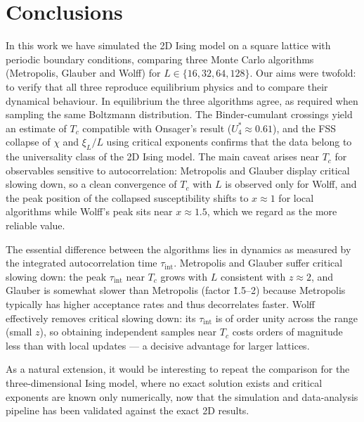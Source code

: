 \chapter{Conclusions} \label{chap:conclusiones}

In this work we have simulated the 2D Ising model on a square lattice with periodic boundary conditions, comparing three Monte Carlo algorithms (Metropolis, Glauber and Wolff) for $L\in\{16,32,64,128\}$. Our aims were twofold: to verify that all three reproduce equilibrium physics and to compare their dynamical behaviour. In equilibrium the three algorithms agree, as required when sampling the same Boltzmann distribution. The Binder-cumulant crossings yield an estimate of $T_c$ compatible with Onsager's result ($U_4^*\approx0.61$), and the FSS collapse of $\chi$ and $\xi_L/L$ using critical exponents confirms that the data belong to the universality class of the 2D Ising model. The main caveat arises near $T_c$ for observables sensitive to autocorrelation: Metropolis and Glauber display critical slowing down, so a clean convergence of $T_c$ with $L$ is observed only for Wolff, and the peak position of the collapsed susceptibility shifts to $x\approx1$ for local algorithms while Wolff's peak sits near $x\approx1.5$, which we regard as the more reliable value.

The essential difference between the algorithms lies in dynamics as measured by the integrated autocorrelation time $\tau_{\mathrm{int}}$. Metropolis and Glauber suffer critical slowing down: the peak $\tau_{\mathrm{int}}$ near $T_c$ grows with $L$ consistent with $z\approx2$, and Glauber is somewhat slower than Metropolis (factor \~1.5–2) because Metropolis typically has higher acceptance rates and thus decorrelates faster. Wolff effectively removes critical slowing down: its $\tau_{\mathrm{int}}$ is of order unity across the range (small $z$), so obtaining independent samples near $T_c$ costs orders of magnitude less than with local updates — a decisive advantage for larger lattices.

As a natural extension, it would be interesting to repeat the comparison for the three-dimensional Ising model, where no exact solution exists and critical exponents are known only numerically, now that the simulation and data-analysis pipeline has been validated against the exact 2D results.

